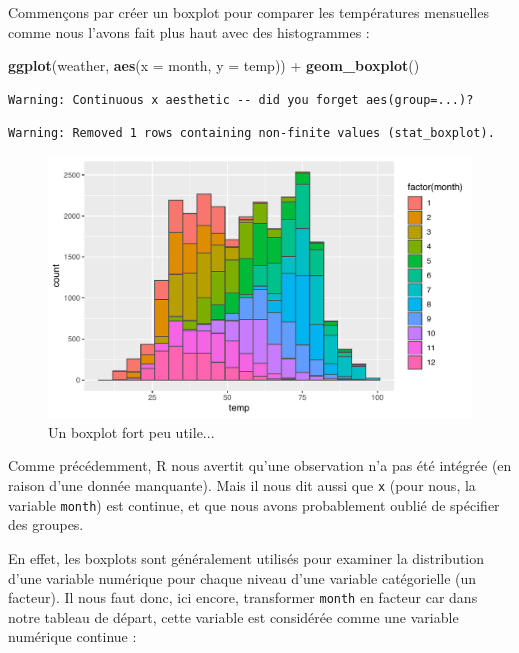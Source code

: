 \documentclass[a4paperpaper,]{article}
\newenvironment{Shaded}{\begin{snugshade}}{\end{snugshade}}
\newcommand{\DataTypeTok}[1]{\textcolor[rgb]{0.00,0.34,0.68}{#1}}
\newcommand{\KeywordTok}[1]{\textcolor[rgb]{0.12,0.11,0.11}{\textbf{#1}}}
\newcommand{\NormalTok}[1]{\textcolor[rgb]{0.12,0.11,0.11}{#1}}
\newcommand{\OperatorTok}[1]{\textcolor[rgb]{0.12,0.11,0.11}{#1}}
\newcommand{\StringTok}[1]{\textcolor[rgb]{0.75,0.01,0.01}{#1}}
\begin{document}
Commençons par créer un boxplot pour comparer les températures mensuelles comme nous l'avons fait plus haut avec des histogrammes :

\begin{Shaded}
\begin{Highlighting}[]
\KeywordTok{ggplot}\NormalTok{(weather, }\KeywordTok{aes}\NormalTok{(}\DataTypeTok{x =}\NormalTok{ month, }\DataTypeTok{y =}\NormalTok{ temp)) }\OperatorTok{+}
\StringTok{  }\KeywordTok{geom_boxplot}\NormalTok{()}
\end{Highlighting}
\end{Shaded}

\begin{verbatim}
Warning: Continuous x aesthetic -- did you forget aes(group=...)?
\end{verbatim}

\begin{verbatim}
Warning: Removed 1 rows containing non-finite values (stat_boxplot).
\end{verbatim}

\begin{figure}[htpb]

{\centering \includegraphics[width=0.9\linewidth]{figure/unnamed-chunk-53-1} 

}

\caption{Un boxplot fort peu utile...}\label{fig:unnamed-chunk-53}
\end{figure}

Comme précédemment, R nous avertit qu'une observation n'a pas été intégrée (en raison d'une donnée manquante). Mais il nous dit aussi que \texttt{x} (pour nous, la variable \texttt{month}) est continue, et que nous avons probablement oublié de spécifier des groupes.

En effet, les boxplots sont généralement utilisés pour examiner la distribution d'une variable numérique pour chaque niveau d'une variable catégorielle (un facteur). Il nous faut donc, ici encore, transformer \texttt{month} en facteur car dans notre tableau de départ, cette variable est considérée comme une variable numérique continue :
\end{document}
